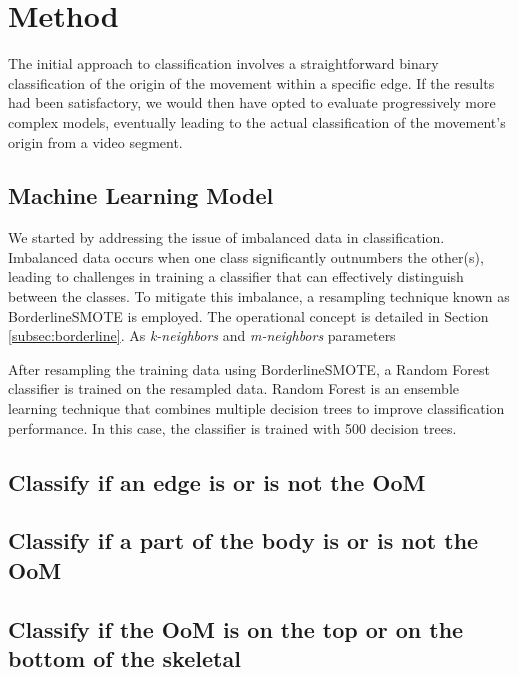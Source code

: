 \chapter{Method}

The initial approach to classification involves a straightforward binary classification of the origin of the movement within a specific edge.
If the results had been satisfactory, we would then have opted to evaluate progressively more complex models, eventually leading to the actual classification of the movement's origin from a video segment.

\section{Machine Learning Model}
We started by addressing the issue of imbalanced data in classification. Imbalanced data occurs when one class significantly outnumbers the other(s), leading to challenges in training a classifier that can effectively distinguish between the classes.
To mitigate this imbalance, a resampling technique known as BorderlineSMOTE is employed. The operational concept is detailed in Section \ref{subsec:borderline}.
As \textit{k-neighbors} and \textit{m-neighbors} parameters  

After resampling the training data using BorderlineSMOTE, a Random Forest classifier is trained on the resampled data. 
Random Forest is an ensemble learning technique that combines multiple decision trees to improve classification performance. 
In this case, the classifier is trained with 500 decision trees.

\section{Classify if an edge is or is not the OoM}

\section{Classify if a part of the body is or is not the OoM}

\section{Classify if the OoM is on the top or on the bottom of the skeletal}




